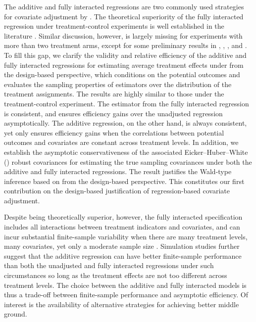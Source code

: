 \documentclass[11pt]{article}
\theoremstyle{definition}
\begin{document}
The additive and fully interacted regressions are two commonly used strategies for covariate adjustment by \ols. 
The theoretical superiority of the fully interacted regression under treatment-control experiments is well established in the literature \citep[see, e.g.,][]{Freedman08a, Lin13, LD20}.
Similar discussion, however, is largely missing for   experiments with more than two treatment arms, except for some preliminary results in  \cite{Freedman2008b}, \cite{Lin13},  \cite{lu2016covariate}, and \cite{schochet2018design}.
To fill this gap, we clarify the validity and relative efficiency of the additive and fully interacted regressions for estimating average treatment effects under \mess from the design-based perspective, which conditions on the potential outcomes and evaluates the sampling properties of estimators over the distribution of the treatment assignments.
The results are highly similar to those under the treatment-control experiment.  
The \olss estimator from the fully interacted regression is consistent, and ensures efficiency gains over the unadjusted regression asymptotically. 
The additive regression, on the other hand, is always consistent, yet only ensures efficiency gains when the correlations between potential outcomes and covariates are constant across treatment levels.  
In addition, we establish the asymptotic conservativeness of the associated Eicker--Huber--White (\ehw) robust covariances for estimating the true sampling covariances under both the additive and fully interacted regressions. 
The result justifies the Wald-type inference based on \olss from the design-based perspective.
This constitutes our first contribution on the design-based justification of regression-based covariate adjustment. 

Despite being theoretically superior, however, the fully interacted specification includes all interactions between treatment indicators and covariates, and can incur substantial finite-sample variability when there are many treatment levels, many covariates, yet only a moderate sample size  \citep{ZDa}. 
Simulation studies further suggest that the additive regression can have better finite-sample performance than both the unadjusted and fully interacted regressions under such circumstances so long as the treatment effects are not too different across treatment levels. 
The choice between the additive and fully interacted models is thus a trade-off between finite-sample performance and  asymptotic efficiency.
Of interest is the availability of alternative strategies for achieving better middle ground. 
\end{document}
